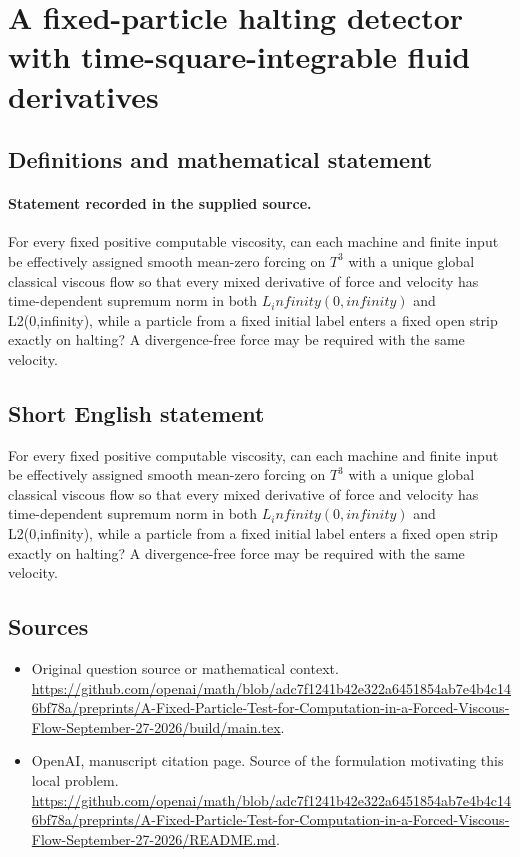 \documentclass[11pt]{article}
\begin{document}
\section*{A fixed-particle halting detector with time-square-integrable fluid derivatives}\label{30007329}
\subsection{Definitions and mathematical statement}
\paragraph{Statement recorded in the supplied source.}
For every fixed positive computable viscosity, can each machine and finite input be effectively assigned smooth mean-zero forcing on $T^3$ with a unique global classical viscous flow so that every mixed derivative of force and velocity has time-dependent supremum norm in both $L_infinity(0,infinity)$ and L2(0,infinity), while a particle from a fixed initial label enters a fixed open strip exactly on halting? A divergence-free force may be required with the same velocity.
\subsection{Short English statement}
For every fixed positive computable viscosity, can each machine and finite input be effectively assigned smooth mean-zero forcing on $T^3$ with a unique global classical viscous flow so that every mixed derivative of force and velocity has time-dependent supremum norm in both $L_infinity(0,infinity)$ and L2(0,infinity), while a particle from a fixed initial label enters a fixed open strip exactly on halting? A divergence-free force may be required with the same velocity.
\subsection{Sources}
\begin{itemize}
\item[S1] Original question source or mathematical context.
\url{https://github.com/openai/math/blob/adc7f1241b42e322a6451854ab7e4b4c146bf78a/preprints/A-Fixed-Particle-Test-for-Computation-in-a-Forced-Viscous-Flow-September-27-2026/build/main.tex}.
\item[S2] OpenAI, manuscript citation page. Source of the formulation motivating this local problem.
\url{https://github.com/openai/math/blob/adc7f1241b42e322a6451854ab7e4b4c146bf78a/preprints/A-Fixed-Particle-Test-for-Computation-in-a-Forced-Viscous-Flow-September-27-2026/README.md}.
\end{itemize}
\end{document}
